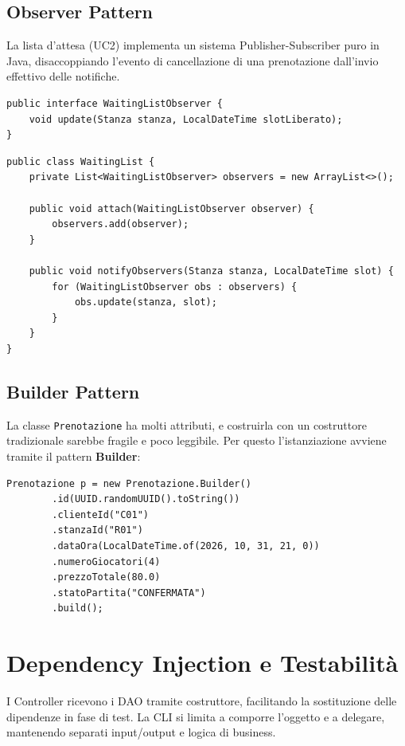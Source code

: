 \subsection{Observer Pattern}
La lista d'attesa (UC2) implementa un sistema Publisher-Subscriber puro in Java, disaccoppiando l'evento di cancellazione di una prenotazione dall'invio effettivo delle notifiche.

\begin{lstlisting}[caption={Interfaccia Observer (\texttt{WaitingListObserver.java})}, label={lst:observer_interface}]
public interface WaitingListObserver {
    void update(Stanza stanza, LocalDateTime slotLiberato);
}
\end{lstlisting}

\begin{lstlisting}[caption={Subject concreto (\texttt{WaitingList.java})}, label={lst:observer_subject}]
public class WaitingList {
    private List<WaitingListObserver> observers = new ArrayList<>();

    public void attach(WaitingListObserver observer) {
        observers.add(observer);
    }

    public void notifyObservers(Stanza stanza, LocalDateTime slot) {
        for (WaitingListObserver obs : observers) {
            obs.update(stanza, slot);
        }
    }
}
\end{lstlisting}

\subsection{Builder Pattern}
La classe \texttt{Prenotazione} ha molti attributi, e costruirla con un costruttore tradizionale sarebbe fragile e poco leggibile. Per questo l'istanziazione avviene tramite il pattern \textbf{Builder}:

\begin{lstlisting}[caption={Builder Pattern per la classe Prenotazione}, label={lst:builder_pattern}]
Prenotazione p = new Prenotazione.Builder()
        .id(UUID.randomUUID().toString())
        .clienteId("C01")
        .stanzaId("R01")
        .dataOra(LocalDateTime.of(2026, 10, 31, 21, 0))
        .numeroGiocatori(4)
        .prezzoTotale(80.0)
        .statoPartita("CONFERMATA")
        .build();
\end{lstlisting}

\section{Dependency Injection e Testabilità}
I Controller ricevono i DAO tramite costruttore, facilitando la sostituzione delle dipendenze in fase di test. La CLI si limita a comporre l'oggetto e a delegare, mantenendo separati input/output e logica di business.

